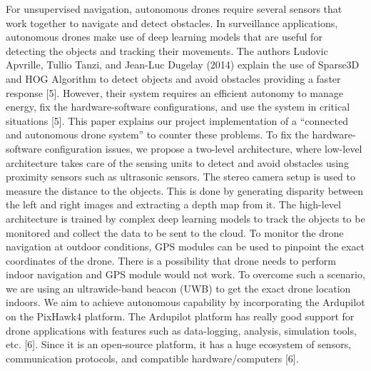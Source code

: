 \documentclass{IEEEtran}
\begin{document}
\newline For unsupervised navigation, autonomous drones require several sensors that work together to navigate and detect obstacles. In surveillance applications, autonomous drones make use of deep learning models that are useful for detecting the objects and tracking their movements. The authors Ludovic Apvrille, Tullio Tanzi, and Jean-Luc Dugelay (2014) explain the use of Sparse3D and HOG Algorithm to detect objects and avoid obstacles providing a faster response [5]. However, their system requires an efficient autonomy to manage energy, fix the hardware-software configurations, and use the system in critical situations [5]. This paper explains our project implementation of a “connected and autonomous drone system” to counter these problems.
\newline To fix the hardware-software configuration issues, we propose a two-level architecture, where low-level architecture takes care of the sensing units to detect and avoid obstacles using proximity sensors such as ultrasonic sensors. The stereo camera setup is used to measure the distance to the objects. This is done by generating disparity between the left and right images and extracting a depth map from it. The high-level architecture is trained by complex deep learning models to track the objects to be monitored and collect the data to be sent to the cloud. To monitor the drone navigation at outdoor conditions, GPS modules can be used to pinpoint the exact coordinates of the drone. There is a possibility that drone needs to perform indoor navigation and GPS module would not work. To overcome such a scenario, we are using an ultrawide-band beacon (UWB) to get the exact drone location indoors. We aim to achieve autonomous capability by incorporating the Ardupilot on the PixHawk4 platform. The Ardupilot platform has really good support for drone applications with features such as data-logging, analysis, simulation tools, etc. [6]. Since it is an open-source platform, it has a huge ecosystem of sensors, communication protocols, and compatible hardware/computers [6].
\end{document}

